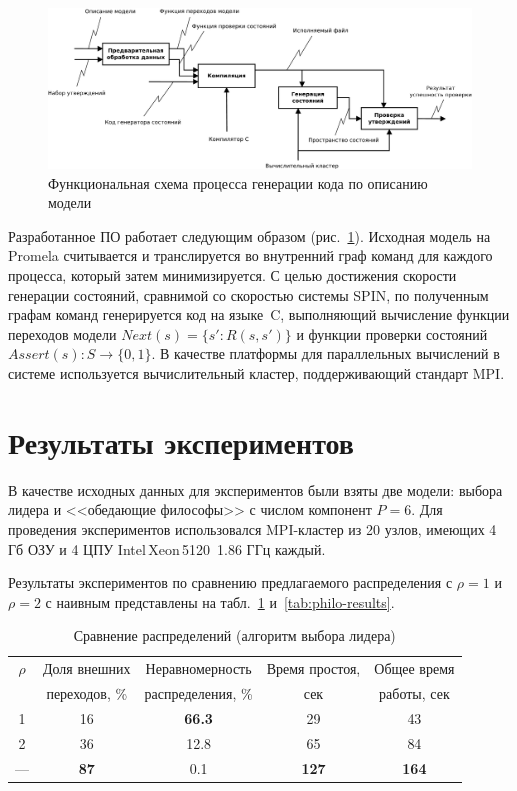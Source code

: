\documentclass[12pt,a4paper,fleqn]{article}
\begin{document}
\begin{figure}[ht]
  \centering
  \includegraphics[width=\textwidth]{graphics/stategen-idef0-simple.pdf}
  \caption{Функциональная схема процесса генерации кода по описанию модели}
  \label{fig:stategen-idef0-simple}
\end{figure}

Разработанное ПО работает следующим образом (рис.~\ref{fig:stategen-idef0-simple}). Исходная модель на Promela считывается и транслируется во внутренний граф команд для каждого процесса, который затем минимизируется.
С целью достижения скорости генерации состояний, сравнимой со скоростью системы SPIN, по полученным графам команд генерируется код на языке~C, выполняющий вычисление функции переходов модели $Next(s) = \{s': R(s, s')\}$ и функции проверки состояний $Assert(s): S \rightarrow \{0, 1\}$.
В качестве платформы для параллельных вычислений в системе используется вычислительный кластер, поддерживающий стандарт MPI.

\section{Результаты экспериментов}

В качестве исходных данных для экспериментов были взяты две модели: выбора лидера и <<обедающие философы>> с числом компонент $P = 6$.
Для проведения экспериментов использовался MPI-кластер из 20 узлов, имеющих 4 Гб ОЗУ и 4 ЦПУ Intel\,Xeon\,5120~1.86 ГГц каждый.


Результаты экспериментов по сравнению предлагаемого распределения с $\rho = 1$ и $\rho = 2$ с наивным представлены на табл.~\ref{tab:election-results} и~\ref{tab:philo-results}.

\begin{table}[htb]
  \centering
  \begin{tabular}{|c|c|c|c|c|}
    \hline
    $\rho$ & Доля внешних        & Неравномерность   & Время простоя, & Общее время \\
           & переходов, \%       & распределения, \% & сек            & работы, сек                 \\ \hline
    1      & 16                  & \textbf{66.3}     & 29             & 43                  \\ \hline
    2      & 36                  & 12.8              & 65             & 84                  \\ \hline
    ---    & \textbf{87}         & 0.1               & \textbf{127}   & \textbf{164}        \\ \hline
  \end{tabular}
  \caption{Сравнение распределений (алгоритм выбора лидера)}
  \label{tab:election-results}
\end{table}
\end{document}
